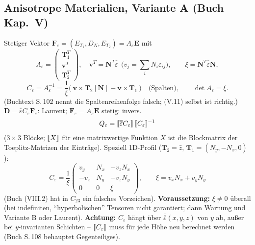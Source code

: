 \subsection{Anisotrope Materialien, Variante A (Buch Kap.~V)}
Stetiger Vektor $\mathbf F_\varepsilon=(E_{T_1},D_N,E_{T_2})=A_\varepsilon\mathbf E$ mit
\begin{equation}
  A_\varepsilon=\begin{pmatrix}\mathbf T_1^T\\ \mathbf v^T\\ \mathbf T_2^T\end{pmatrix},\quad
  \mathbf v^T=\mathbf N^T\overline{\overline\varepsilon}\ \ \big(v_j=\textstyle\sum_iN_i\varepsilon_{ij}\big),\qquad
  \xi=\mathbf N^T\overline{\overline\varepsilon}\mathbf N,
  \label{eq:Aeps}
\end{equation}
\begin{equation}
  C_\varepsilon=A_\varepsilon^{-1}=\frac{1}{\xi}\Big(\ \mathbf v\times\mathbf T_2\ \Big|\ \mathbf N\ \Big|\ -\mathbf v\times\mathbf T_1\ \Big)
  \quad\text{(Spalten)},\qquad \det A_\varepsilon=\xi .
  \label{eq:Ceps}
\end{equation}
(Buchtext S.\,102 nennt die Spaltenreihenfolge falsch; (V.11) selbst ist richtig.)
$\mathbf D=\overline{\overline\varepsilon}C_\varepsilon\mathbf F_\varepsilon$: Laurent; $\mathbf F_\varepsilon=A_\varepsilon\mathbf E$ stetig: invers.
\begin{equation}
  Q_\varepsilon=[\![\overline{\overline\varepsilon}C_\varepsilon]\!]\,[\![C_\varepsilon]\!]^{-1}
  \label{eq:QaniA}
\end{equation}
($3\times3$ Blöcke; $[\![X]\!]$ für eine matrixwertige Funktion $X$ ist die Blockmatrix der Toeplitz-Matrizen
der Einträge). Speziell 1D-Profil ($\mathbf T_2=\hat z$, $\mathbf T_1=(N_y,-N_x,0)$):
\begin{equation}
  C_\varepsilon=\frac1\xi\begin{pmatrix}v_y&N_x&-v_zN_x\\-v_x&N_y&-v_zN_y\\0&0&\xi\end{pmatrix},\qquad
  \xi=v_xN_x+v_yN_y
  \label{eq:C1d}
\end{equation}
(Buch (VIII.2) hat in $C_{23}$ ein falsches Vorzeichen). \textbf{Voraussetzung:} $\xi\ne0$ überall
(bei indefiniten, \enquote{hyperbolischen} Tensoren nicht garantiert; dann Warnung und Variante B
oder Laurent). \textbf{Achtung:} $C_\varepsilon$ hängt über $\overline{\overline\varepsilon}(x,y,z)$ von $y$ ab, außer bei
$y$-invarianten Schichten -- $[\![C_\varepsilon]\!]$ muss für jede Höhe neu berechnet werden (Buch S.\,108
behauptet Gegenteiliges).

